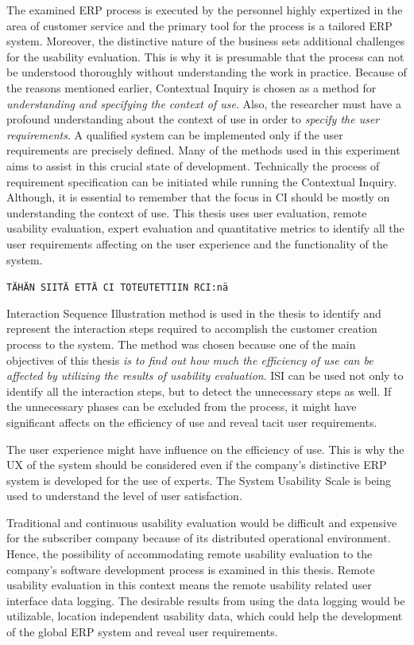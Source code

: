 \documentclass[12pt,a4paper,oneside,pdftex]{report}
\begin{document}
The examined ERP process is executed by the personnel highly expertized in the area of customer service and the primary tool for the process is a tailored ERP system. Moreover, the distinctive nature of the business sets additional challenges for the usability evaluation. This is why it is presumable that the process can not be understood thoroughly without understanding the work in practice. Because of the reasons mentioned earlier, Contextual Inquiry is chosen as a method for \emph{understanding and specifying the context of use}. 
Also, the researcher must have a profound understanding about the context of use in order to \emph{specify the user requirements}. A qualified system can be implemented only if the user requirements are precisely defined. Many of the methods used in this experiment aims to assist in this crucial state of development. Technically the process of requirement specification can be initiated while running the Contextual Inquiry. Although, it is essential to remember that the focus in CI should be mostly on understanding the context of use. This thesis uses user evaluation, remote usability evaluation, expert evaluation and quantitative metrics to identify all the user requirements affecting on the user experience and the functionality of the system. 

\texttt{TÄHÄN SIITÄ ETTÄ CI TOTEUTETTIIN RCI:nä}

Interaction Sequence Illustration method is used in the thesis to identify and represent the interaction steps required to accomplish the customer creation process to the system. The method was chosen because one of the main objectives of this thesis \emph{is to find out how much the efficiency of use can be affected by utilizing the results of usability evaluation}. ISI can be used not only to identify all the interaction steps, but to detect the unnecessary steps as well. If the unnecessary phases can be excluded from the process, it might have significant affects on the efficiency of use and reveal tacit user requirements. 

The user experience might have influence on the efficiency of use. This is why the UX of the system should be considered even if the company's distinctive ERP system is developed for the use of experts. The System Usability Scale is being used to understand the level of user satisfaction.

Traditional and continuous usability evaluation would be difficult and expensive for the subscriber company because of its distributed operational environment. Hence, the possibility of accommodating remote usability evaluation to the company's software development process is examined in this thesis. Remote usability evaluation in this context means the remote usability related user interface data logging. The desirable results from using the data logging would be utilizable, location independent usability data, which could help the development of the global ERP system and reveal user requirements. 
\end{document}
